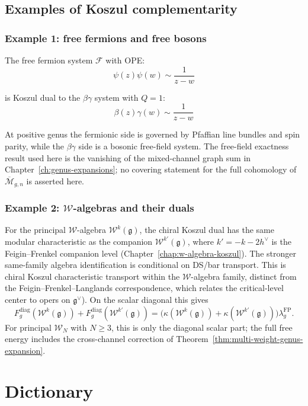 \subsection{Examples of Koszul complementarity}

\subsubsection{Example 1: free fermions and free bosons}

The free fermion system $\mathcal{F}$ with OPE:
\[\psi(z)\psi(w) \sim \frac{1}{z-w}\]

is Koszul dual to the $\beta\gamma$ system with $Q = 1$:
\[\beta(z)\gamma(w) \sim \frac{1}{z-w}\]

At positive genus the fermionic side is governed by Pfaffian line
bundles and spin parity, while the $\beta\gamma$ side is a bosonic
free-field system.  The free-field exactness result used here is the
vanishing of the mixed-channel graph sum in
Chapter~\ref{ch:genus-expansions}; no covering statement for the full
cohomology of $\overline{\mathcal M}_{g,n}$ is asserted here.

\subsubsection{Example 2: $\mathcal{W}$-algebras and their duals}

For the principal $\mathcal{W}$-algebra $\mathcal{W}^k(\mathfrak{g})$, the
chiral Koszul dual has the same modular characteristic as the
companion $\mathcal{W}^{k'}(\mathfrak{g})$, where
$k' = -k - 2h^\vee$ is the Feigin--Frenkel companion level
(Chapter~\ref{chap:w-algebra-koszul}). The stronger same-family
algebra identification is conditional on DS/bar transport. This is
chiral Koszul characteristic transport within the
$\mathcal{W}$-algebra family, distinct from the
Feigin--Frenkel--Langlands correspondence, which relates the
critical-level center to opers on $\mathfrak{g}^\vee$).
On the scalar diagonal this gives
\[
F_g^{\mathrm{diag}}(\mathcal W^k(\mathfrak g))
+F_g^{\mathrm{diag}}(\mathcal W^{k'}(\mathfrak g))
 =
\bigl(\kappa(\mathcal W^k(\mathfrak g))
+\kappa(\mathcal W^{k'}(\mathfrak g))\bigr)
\lambda_g^{\mathrm{FP}}.
\]
For principal $\mathcal W_N$ with $N\geq 3$, this is only the
diagonal scalar part; the full free energy includes the cross-channel
correction of Theorem~\ref{thm:multi-weight-genus-expansion}.

\section{Dictionary}

